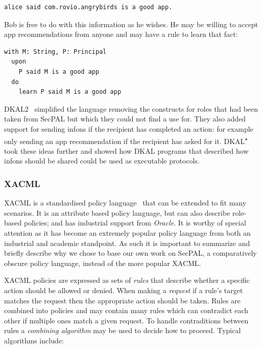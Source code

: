 \documentclass[thesis.tex]{subfiles}
\begin{document}
\begin{lstlisting}
alice said com.rovio.angrybirds is a good app.
\end{lstlisting}

Bob is free to do with this information as he wishes.  He may be
willing to accept app recommendations from anyone and may have a rule
to learn that fact:

\begin{lstlisting}
with M: String, P: Principal
  upon
    P said M is a good app
  do
    learn P said M is a good app
\end{lstlisting}

DKAL2~\cite{yuri_gurevich_dkal2---simplified_2009} simplified the
language removing the constructs for roles that had been taken from
SecPAL but which they could not find a use for.  They also added
support for sending infons if the recipient has completed an action:
for example only sending an app recommendation if the recipient has
asked for it.
DKAL\textsuperscript{$\star$}~\cite{jeannin_dkal*:_2013} took these
ideas further and showed how DKAL programs that described how infons
should be shared could be used as executable protocols.

\subsubsection{XACML}

XACML is a standardised policy language~\cite{oasis_extensible_2013}
that can be extended to fit many scenarios. It is an attribute based
policy language, but can also describe role-based policies; and has
industrial support from \emph{Oracle}.  It is worthy of special
attention as it has become an extremely popular policy language from
both an industrial and academic standpoint.  As such it is important
to summarize and briefly describe why we chose to base our own work on
SecPAL, a comparatively obscure policy language, instead of the more
popular XACML.

XACML policies are expressed as sets of \emph{rules} that describe
whether a specific action should be allowed or denied. When making a
\emph{request} if a rule's target matches the request then the
appropriate action should be taken. Rules are combined into policies
and may contain many rules which can contradict each other if multiple
ones match a given request. To handle contraditions between rules a
\emph{combining algorithm} may be used to decide how to
proceed. Typical algorithms include:
\end{document}
